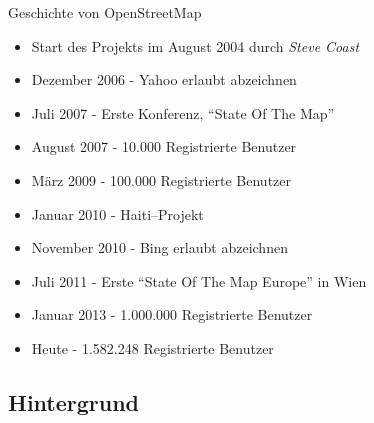 \documentclass{beamer}
\begin{document}
{


\begin{frame}{Geschichte von OpenStreetMap}
  \vspace{0.6cm}
\begin{itemize}
  \item Start des Projekts im August 2004 durch \emph{Steve Coast}
  \item Dezember 2006 - Yahoo erlaubt abzeichnen
  \item Juli 2007 - Erste Konferenz, "`State Of The Map"'
  \item August 2007 - 10.000 Registrierte Benutzer
  \item März 2009 - 100.000 Registrierte Benutzer
  \item Januar 2010 - Haiti--Projekt
  \item November 2010 - Bing erlaubt abzeichnen
  \item Juli 2011 - Erste "`State Of The Map Europe"' in Wien
  \item Januar 2013 - 1.000.000 Registrierte Benutzer
  \item Heute - 1.582.248 Registrierte Benutzer
\end{itemize}

\end{frame}
}


\subsection{Hintergrund}
\end{document}
